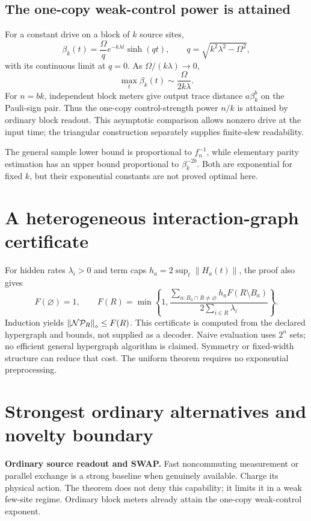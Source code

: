 \documentclass[11pt,a4paper]{article}
\newcommand{\norm}[1]{\left\lVert #1\right\rVert}
\newcommand{\calN}{\mathcal N}\newcommand{\calU}{\mathcal U}\newcommand{\calV}{\mathcal V}
\begin{document}
\subsection{The one-copy weak-control power is attained}
For a constant drive on a block of $k$ source sites,
\begin{equation}
\beta_k(t)=\frac{\Omega}{q}e^{-k\lambda t}\sinh(qt),\qquad q=\sqrt{k^2\lambda^2-\Omega^2},
\end{equation}
with its continuous limit at $q=0$. As $\Omega/(k\lambda)\to0$,
\begin{equation}
\max_t\beta_k(t)\sim\frac{\Omega}{2k\lambda}.
\end{equation}
For $n=bk$, independent block meters give output trace distance $a\beta_k^b$ on the Pauli-sign pair. Thus the one-copy control-strength power $n/k$ is attained by ordinary block readout. This asymptotic comparison allows nonzero drive at the input time; the triangular construction separately supplies finite-slew readability.

The general sample lower bound is proportional to $f_n^{-1}$, while elementary parity estimation has an upper bound proportional to $\beta_k^{-2b}$. Both are exponential for fixed $k$, but their exponential constants are not proved optimal here.

\section{A heterogeneous interaction-graph certificate}
For hidden rates $\lambda_i>0$ and term caps $h_a=2\sup_t\norm{H_a(t)}$, the proof also gives
\begin{equation}
F(\varnothing)=1,\qquad F(R)=\min\!\left\{1,
\frac{\sum_{a:B_a\cap R\ne\varnothing}h_a F(R\setminus B_a)}{2\sum_{i\in R}\lambda_i}\right\}.
\end{equation}
Induction yields $\norm{\calN\calP_R}_\diamond\le F(R)$. This certificate is computed from the declared hypergraph and bounds, not supplied as a decoder. Naive evaluation uses $2^n$ sets; no efficient general hypergraph algorithm is claimed. Symmetry or fixed-width structure can reduce that cost. The uniform theorem requires no exponential preprocessing.

\section{Strongest ordinary alternatives and novelty boundary}

\textbf{Ordinary source readout and SWAP.} Fast noncommuting measurement or parallel exchange is a strong baseline when genuinely available. Charge its physical action. The theorem does not deny this capability; it limits it in a weak few-site regime. Ordinary block meters already attain the one-copy weak-control exponent.
\end{document}
